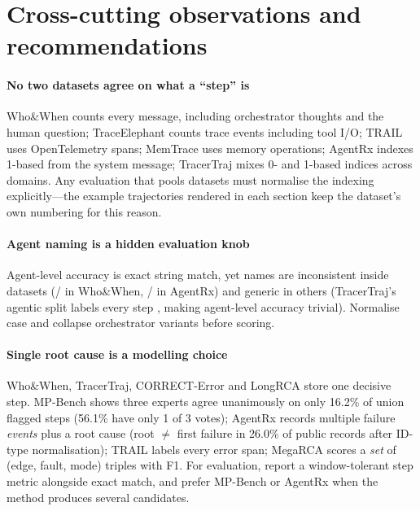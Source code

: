 \section{Cross-cutting observations and recommendations}\label{sec:reco}

\paragraph{No two datasets agree on what a ``step'' is} Who\&When counts every message, including orchestrator thoughts and the human question; TraceElephant counts trace events including tool I/O; TRAIL uses OpenTelemetry spans; MemTrace uses memory operations; AgentRx indexes 1-based from the system message; TracerTraj mixes 0- and 1-based indices across domains. Any evaluation that pools datasets must normalise the indexing explicitly---the example trajectories rendered in each section keep the dataset's own numbering for this reason.

\paragraph{Agent naming is a hidden evaluation knob} Agent-level accuracy is exact string match, yet names are inconsistent inside datasets (/ in Who\&When, / in AgentRx) and generic in others (TracerTraj's agentic split labels every step , making agent-level accuracy trivial). Normalise case and collapse orchestrator variants before scoring.

\paragraph{Single root cause is a modelling choice} Who\&When, TracerTraj, CORRECT-Error and LongRCA store one decisive step. MP-Bench shows three experts agree unanimously on only 16.2\% of union flagged steps (56.1\% have only 1 of 3 votes); AgentRx records multiple failure \emph{events} plus a root cause (root $\ne$ first failure in 26.0\% of public records after ID-type normalisation); TRAIL labels every error span; MegaRCA scores a \emph{set} of (edge, fault, mode) triples with F1. For evaluation, report a window-tolerant step metric alongside exact match, and prefer MP-Bench or AgentRx when the method produces several candidates.

